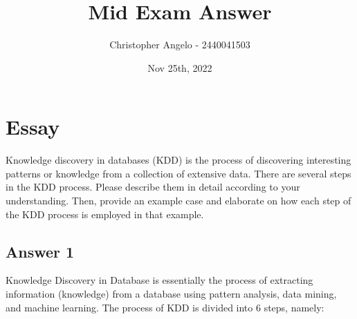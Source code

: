 \documentclass[
  11pt, %
]{assignment}
\author{Christopher Angelo - 2440041503}
\institute{BINUS University\\ Global Class}
\date{Nov 25th, 2022}
\title{Mid Exam Answer}
\begin{document}
\maketitle


\section*{Essay}

\begin{problem}
Knowledge discovery in databases (KDD) is the process of discovering interesting patterns or knowledge from a collection of extensive data. There are several steps in the KDD process. Please describe them in detail according to your understanding. Then, provide an example case and elaborate on how each step of the KDD process is employed in that example.
\end{problem}

\subsection*{Answer 1}

Knowledge Discovery in Database is essentially the process of extracting information (knowledge) from a database using pattern analysis, data mining, and machine learning. The process of KDD is divided into 6 steps, namely:
\end{document}
